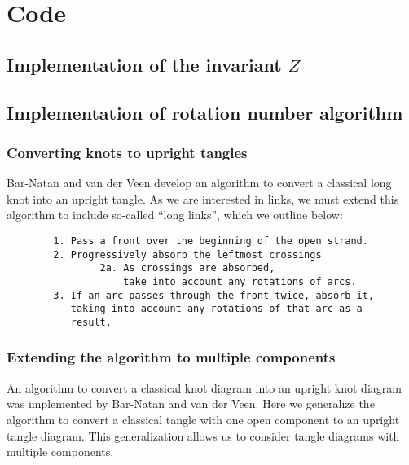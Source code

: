 \chapter{Code}
\section{Implementation of the invariant $Z$}



\section{Implementation of rotation number algorithm}


\subsection{Converting knots to upright tangles}

Bar-Natan and van der Veen develop an algorithm to convert a classical long knot
into an upright tangle. As we are interested in links, we must extend this
algorithm to include so-called \enquote{long links}, which we outline below:
\begin{verbatim}
        1. Pass a front over the beginning of the open strand.
        2. Progressively absorb the leftmost crossings
                2a. As crossings are absorbed,
                    take into account any rotations of arcs.
        3. If an arc passes through the front twice, absorb it,
           taking into account any rotations of that arc as a
           result.
\end{verbatim}

\subsection{Extending the algorithm to multiple components}

An algorithm to convert a classical knot diagram into an upright knot diagram
was implemented by Bar-Natan and van der Veen. Here we generalize the algorithm
to convert a classical tangle with one open component to an upright tangle
diagram. This generalization allows us to consider tangle diagrams with multiple
components.


